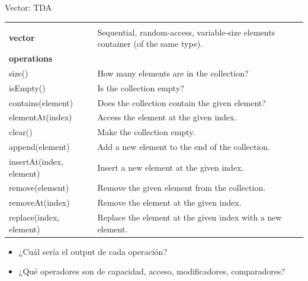 \documentclass{beamer} %
\begin{document}
\begin{frame}{Vector: TDA}
    \scriptsize{
    \begin{tabular}{lp{60ex}}\hline\\[-1ex]
      {\bf\normalsize vector} & Sequential, random-access, variable-size elements container (of the same type).\\
      {\bf\small operations}  & \\
      size()            & How many elements are in the collection?\\
      isEmpty()         & Is the collection empty?\\
      contains(element) & Does the collection contain the given element?\\
      elementAt(index)  & Access the element at the given index.\\
      clear()           & Make the collection empty.\\
      append(element)   & Add a new element to the end of the collection.\\
      insertAt(index, element) & Insert a new element at the given index.\\
      remove(element)   & Remove the given element from the collection.\\
      removeAt(index)   & Remove the element at the given index.\\
      replace(index, element) & Replace the element at the given index with a new element.\\[1.5ex]\hline
    \end{tabular}

    \begin{itemize}
        \item<2-> ¿Cuál sería el output de cada operación?
        \item<3-> ¿Qué operadores son de capacidad, acceso, modificadores, comparadores?
    \end{itemize}}
\end{frame}
\end{document}
